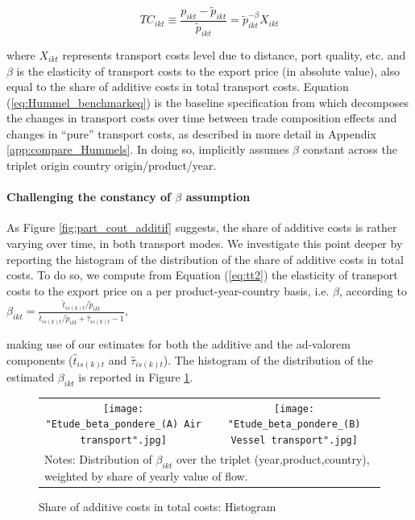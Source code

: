 \documentclass[a4paper,11pt]{article}
\begin{document}
\begin{equation}
TC_{ikt}\equiv \frac{p_{ikt}-\widetilde{p}_{ikt}}{\widetilde{p}_{ikt}} = \widetilde{p}_{ikt}^{-\beta}X_{ikt} \label{eq:Hummel_benchmarkeq}
\end{equation}

\noindent where $X_{ikt}$ represents transport costs level due to distance, port quality, etc. and $\beta$ is the elasticity of transport costs to the export price (in absolute value), also equal to the share of additive costs in total transport costs.
Equation (\ref{eq:Hummel_benchmarkeq}) is the baseline specification from which \cite{hummels2007} decomposes the changes in transport costs over time between trade composition effects and changes in ``pure'' transport costs, as described in more detail in Appendix \ref{app:compare_Hummels}.
In doing so, \cite{hummels2007} implicitly assumes $\beta$ constant across the triplet origin country origin/product/year.

\paragraph{Challenging the  constancy of $\beta$ assumption} As Figure \ref{fig:part_cout_additif} suggests, the share of additive costs is rather varying over time, in both transport modes.
We investigate this point deeper by reporting the histogram of the distribution of the share of additive costs in total costs.
To do so, we compute from Equation (\ref{eq:tt2}) the elasticity of transport costs to the export price on a per product-year-country basis, i.e.
$\beta$, according to $\beta_{ikt} = \frac{\widehat{t}_{is(k)t}/\widetilde{p}_{ikt}}{\widehat{t}_{is(k)t}/\widetilde{p}_{ikt}+\widehat{\tau}_{is(k)t}-1},
$

\noindent making use of our estimates for both the additive and the ad-valorem components ($\widehat{t}_{is(k)t}$ and $\widehat{\tau}_{is(k)t}$). The histogram of the distribution of the estimated $\beta_{ikt}$ is reported in Figure \ref{fig:histogram_beta}.


\begin{figure}[htbp]
\caption{Share of additive costs in total costs: Histogram}
\label{fig:histogram_beta}
\begin{center}
\begin{tabular}{cc}
\texttt{[image: "Etude\_beta\_pondere\_(A) Air transport".jpg]}
& \texttt{[image: "Etude\_beta\_pondere\_(B) Vessel transport".jpg]} \\
\multicolumn{2}{l}{{\footnotesize Notes: Distribution of $\beta_{ikt}$ over the triplet (year,product,country), weighted by share of yearly value of flow.}}\\
\end{tabular}
\end{center}
\end{figure}
\end{document}
